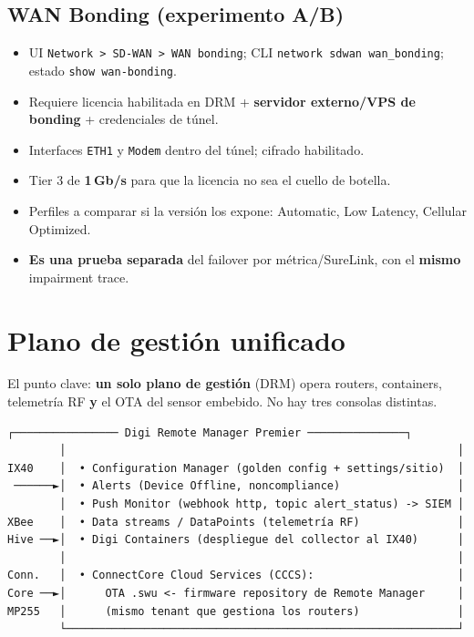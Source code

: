 \documentclass[11pt,a4paper]{article}
\begin{document}
\subsection{WAN Bonding (experimento A/B)}

\begin{itemize}
  \item UI \texttt{Network > SD-WAN > WAN bonding}; CLI \texttt{network sdwan wan\_bonding};
        estado \texttt{show wan-bonding}.
  \item Requiere licencia habilitada en DRM + \textbf{servidor externo/VPS de bonding}
        + credenciales de túnel.
  \item Interfaces \texttt{ETH1} y \texttt{Modem} dentro del túnel; cifrado habilitado.
  \item Tier 3 de \textbf{1\,Gb/s} para que la licencia no sea el cuello de botella.
  \item Perfiles a comparar si la versión los expone: Automatic, Low Latency,
        Cellular Optimized.
  \item \textbf{Es una prueba separada} del failover por métrica/SureLink,
        con el \textbf{mismo} impairment trace.
\end{itemize}

\section{Plano de gestión unificado}

\begin{clave}
\small
El punto clave: \textbf{un solo plano de gestión} (DRM) opera routers, containers,
telemetría RF \textbf{y} el OTA del sensor embebido. No hay tres consolas distintas.
\end{clave}

\medskip
\begin{diagbox}
\begin{Verbatim}[fontsize=\footnotesize]
        ┌──────────────── Digi Remote Manager Premier ───────────────┐
        │                                                            │
IX40    │  • Configuration Manager (golden config + settings/sitio)  │
 ──────►│  • Alerts (Device Offline, noncompliance)                  │
        │  • Push Monitor (webhook http, topic alert_status) -> SIEM │
XBee    │  • Data streams / DataPoints (telemetría RF)               │
Hive ──►│  • Digi Containers (despliegue del collector al IX40)      │
        │                                                            │
Conn.   │  • ConnectCore Cloud Services (CCCS):                      │
Core ──►│      OTA .swu <- firmware repository de Remote Manager     │
MP255   │      (mismo tenant que gestiona los routers)               │
        └────────────────────────────────────────────────────────────┘
\end{Verbatim}
\end{diagbox}
\end{document}
